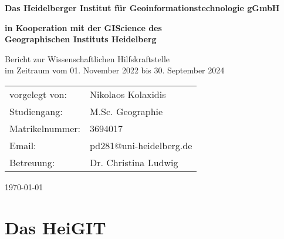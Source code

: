 \documentclass[11pt]{article}
\begin{document}

\begin{titlepage}
\begin{center}

\vspace{-20mm}
\vspace*{20mm}

\begin{Huge}
\textbf{Das Heidelberger Institut für Geoinformationstechnologie gGmbH} \\ [18pt]
\end{Huge}

\begin{LARGE}
\textbf{in Kooperation mit der GIScience des \\ Geographischen Instituts Heidelberg} \\ [6pt]
\end{LARGE}

\vspace{50mm}

\begin{Large}
Bericht zur Wissenschaftlichen Hilfskraftstelle \\ [6pt]
im Zeitraum vom 01. November 2022 bis 30. September 2024
\end{Large}

\vspace{50mm}

\begin{table}[ht]
    \begin{center}
        \begin{tabular}{l l} 
        vorgelegt von: & Nikolaos Kolaxidis \\ [6pt]
        Studiengang: & M.Sc. Geographie \\ [6pt]
        Matrikelnummer: & 3694017 \\ [6pt]
        Email: & pd281@uni-heidelberg.de \\ [6pt]
        Betreuung: & Dr. Christina Ludwig \\
        \end{tabular}
    \end{center}
\end{table}

\vspace*{\fill}
\today

\end{center}
\end{titlepage}

\section{Das HeiGIT}
\end{document}
